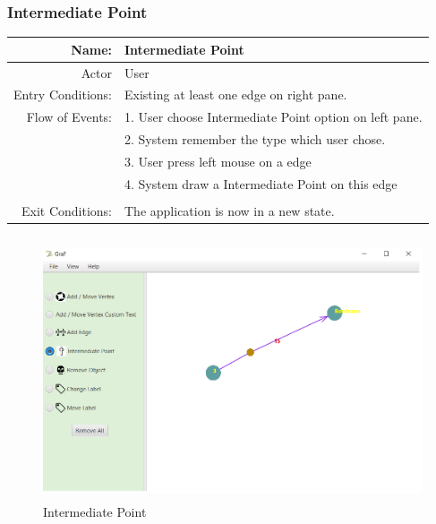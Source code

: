 \documentclass[a4paper,10pt]{article}
\begin{document}
\subsubsection{Intermediate Point}
	\begin{tabular}{|r|l|}
\hline
Name: & Intermediate Point \\
\hline
Actor & User \\
\hline
Entry Conditions: & Existing at least one edge on right pane. \\
\hline
Flow of Events: & 1. User choose Intermediate Point option on left pane. \\
& 2. System remember the type which user chose.  \\
& 3. User press left mouse on a edge  \\
& 4. System draw a Intermediate Point on this edge  \\
\\
\hline
Exit Conditions: & The application is now in a new state. \\
\hline

\end{tabular}
	\paragraph{}
	
\begin{figure}[H]
		\centering
		\includegraphics[height = 3in]{IntermediatePoint.png}
		\caption[Optional caption]{Intermediate Point}
		\label{fig:Repository}
	\end{figure}
\paragraph{}
\end{document}
